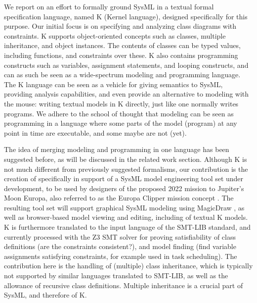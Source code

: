 We report on an effort to formally ground SysML in a textual
formal specification language, named K (Kernel language), designed
specifically for this purpose.  
Our initial focus is on specifying and analyzing class diagrams
with constraints. K supports object-oriented concepts
such as classes, multiple inheritance, and object instances. The
contents of classes can be typed values, including functions, and
constraints over these. K also contains programming constructs such as
variables, assignment statements, and looping constructs, and can as
such be seen as a wide-spectrum modeling and programming language.
The K language can be seen as a vehicle for giving semantics to SysML,
providing analysis capabilities, and even provide an alternative to
modeling with the mouse: writing textual models in K directly, just
like one normally writes programs.  We adhere to the school of thought
that modeling can be seen as programming in a language where some parts of the
model (program) at any point in time are executable, and some maybe
are not (yet).

The idea of merging modeling and programming in one language has been
suggested before, as will be discussed in the related work section.
Although K is not much different from previously suggested formalisms,  
our contribution is the creation of \Klang{} specifically in support of a
SysML model engineering tool set under development, to be used by
designers of the proposed 2022 mission to Jupiter's Moon Europa, also
referred to as the Europa Clipper mission concept
\cite{europa-clipper}.  The resulting tool set will support graphical
SysML modeling using MagicDraw \cite{magicdraw}, as well as
browser-based model viewing and editing, including of textual K
models. K is furthermore translated to the input language of the
SMT-LIB standard, and currently processed with the Z3 SMT solver for
proving satisfiability of class definitions (are the constraints
consistent?), and model finding (find variable assignments satisfying
constraints, for example used in task scheduling).  The contribution here is
the handling of (multiple) class inheritance, which is typically not supported
by similar languages translated to SMT-LIB, as well as the allowance
of recursive class definitions. Multiple inheritance is a crucial part
of SysML, and therefore of K.


